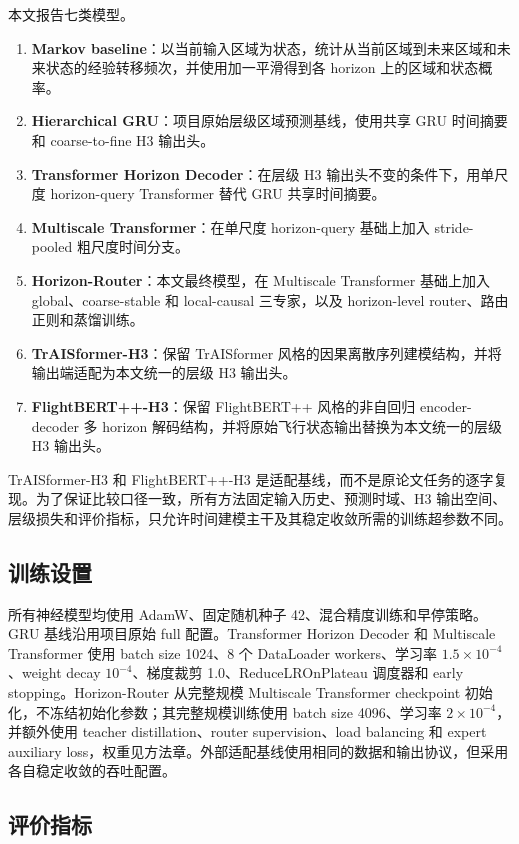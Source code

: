 本文报告七类模型。
\begin{enumerate}
  \item \textbf{Markov baseline}：以当前输入区域为状态，统计从当前区域到未来区域和未来状态的经验转移频次，并使用加一平滑得到各 horizon 上的区域和状态概率。
  \item \textbf{Hierarchical GRU}：项目原始层级区域预测基线，使用共享 GRU 时间摘要和 coarse-to-fine H3 输出头。
  \item \textbf{Transformer Horizon Decoder}：在层级 H3 输出头不变的条件下，用单尺度 horizon-query Transformer 替代 GRU 共享时间摘要。
  \item \textbf{Multiscale Transformer}：在单尺度 horizon-query 基础上加入 stride-pooled 粗尺度时间分支。
  \item \textbf{Horizon-Router}：本文最终模型，在 Multiscale Transformer 基础上加入 global、coarse-stable 和 local-causal 三专家，以及 horizon-level router、路由正则和蒸馏训练。
  \item \textbf{TrAISformer-H3}：保留 TrAISformer 风格的因果离散序列建模结构，并将输出端适配为本文统一的层级 H3 输出头。
  \item \textbf{FlightBERT++-H3}：保留 FlightBERT++ 风格的非自回归 encoder-decoder 多 horizon 解码结构，并将原始飞行状态输出替换为本文统一的层级 H3 输出头。
\end{enumerate}

TrAISformer-H3 和 FlightBERT++-H3 是适配基线，而不是原论文任务的逐字复现。为了保证比较口径一致，所有方法固定输入历史、预测时域、H3 输出空间、层级损失和评价指标，只允许时间建模主干及其稳定收敛所需的训练超参数不同。

\subsection{训练设置}

所有神经模型均使用 AdamW、固定随机种子 42、混合精度训练和早停策略。GRU 基线沿用项目原始 full 配置。Transformer Horizon Decoder 和 Multiscale Transformer 使用 batch size 1024、8 个 DataLoader workers、学习率 $1.5\times10^{-4}$、weight decay $10^{-4}$、梯度裁剪 1.0、ReduceLROnPlateau 调度器和 early stopping。Horizon-Router 从完整规模 Multiscale Transformer checkpoint 初始化，不冻结初始化参数；其完整规模训练使用 batch size 4096、学习率 $2\times10^{-4}$，并额外使用 teacher distillation、router supervision、load balancing 和 expert auxiliary loss，权重见方法章。外部适配基线使用相同的数据和输出协议，但采用各自稳定收敛的吞吐配置。

\subsection{评价指标}

